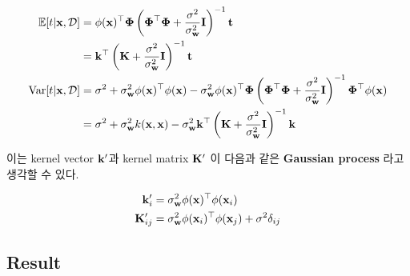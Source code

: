 \documentclass{article} %
\begin{document}
\begin{equation}
\begin{aligned}
	\mathbb{E}[t | {\bf x}, {\cal D}] &= \phi({\bf x})^\top\boldsymbol{\Phi} \left(
	\boldsymbol{\Phi}^\top \boldsymbol{\Phi} + \dfrac{\sigma^2}{\sigma^2_{\bf w}} {\bf I}
	\right)^{-1} {\bf t}
	\\
	&=  {\bf k}^\top \left( {\bf K} + \frac{\sigma^2}{\sigma^2_{\bf w} } {\bf I} \right)^{-1} {\bf t} \\
	{\rm Var}[t | {\bf x}, {\cal D}] &= \sigma^2 + \sigma^2_{\bf w} \phi({\bf x})^\top\phi({\bf x}) - \sigma^2_{\bf w} \phi({\bf x})^\top \boldsymbol{\Phi} \left( \boldsymbol{\Phi}^\top\boldsymbol{\Phi} + \frac{\sigma^2}{\sigma^2_{\bf w}} {\bf I} \right)^{-1} \boldsymbol{\Phi}^\top \phi({\bf x}) \\
	&= \sigma^2 + \sigma^2_{\bf w} k({\bf x}, {\bf x}) - \sigma^2_{\bf w} {\bf k}^\top \left( {\bf K} + \frac{\sigma^2}{\sigma^2_{\bf w}} {\bf I} \right)^{-1} {\bf k}
\end{aligned}
\end{equation}

이는 kernel vector ${\bf k}'$과 kernel matrix ${\bf K}'$ 이 다음과 같은 \textbf{Gaussian process} 라고 생각할 수 있다.

\begin{equation}
\begin{aligned}
	{\bf k}'_{i} &= \sigma^2_{{\bf w}} \phi({\bf x})^\top \phi({\bf x}_i) \\
	{\bf K}'_{ij} &= \sigma^2_{\bf w} \phi({\bf x}_i)^\top \phi({\bf x}_j) + \sigma^2 \delta_{ij}
\end{aligned}
\end{equation}

\subsection{Result}
\end{document}
